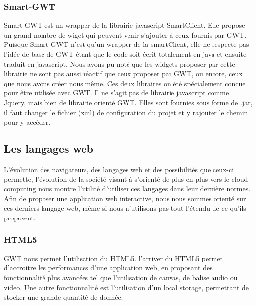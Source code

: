 \subsubsection{Smart-GWT}
Smart-GWT est un wrapper de la librairie javascript SmartClient. Elle propose un grand nombre de wiget qui peuvent venir s'ajouter à ceux fournis par GWT. Puisque Smart-GWT n'est qu'un wrapper de la smartClient, elle ne respecte pas l'idée de base de GWT étant que le code soit écrit totalement en java et ensuite traduit en javascript. Nous avons pu noté que les widgets proposer par cette librairie ne sont pas aussi réactif que ceux proposer par GWT, ou encore, ceux que nous avons créer nous même.
Ces deux libraires on été spécialement concue pour être utilisée avec GWT. Il ne s'agit pas de librairie javascript comme Jquery, mais bien de librairie orienté GWT. Elles sont fournies sous forme de .jar, il faut changer le fichier (xml) de configuration du projet et y rajouter le chemin pour y accéder.



\subsection{Les langages web}
L'évolution des navigateurs, des langages web et des possibilités que ceux-ci permette, l'évolution de la société visant à s'orienté de plus en plus vers le cloud computing nous montre l'utilité d'utiliser ces langages dans leur dernière normes. Afin de proposer une application web interactive, nous nous sommes orienté sur ces derniers langage web, même si nous n'utilisons pas tout l'étendu de ce qu'ils proposent.

\subsubsection{HTML5}
GWT nous permet l'utilisation du HTML5. l'arriver du HTML5 permet d'accroitre les performances d'une application web, en proposant des fonctionnalité plus avancées tel que l'utilisation de canvas, de balise audio ou video. Une autre fonctionnalité est l'utilisation d'un local storage, permettant de stocker une grande quantité de donnée.
